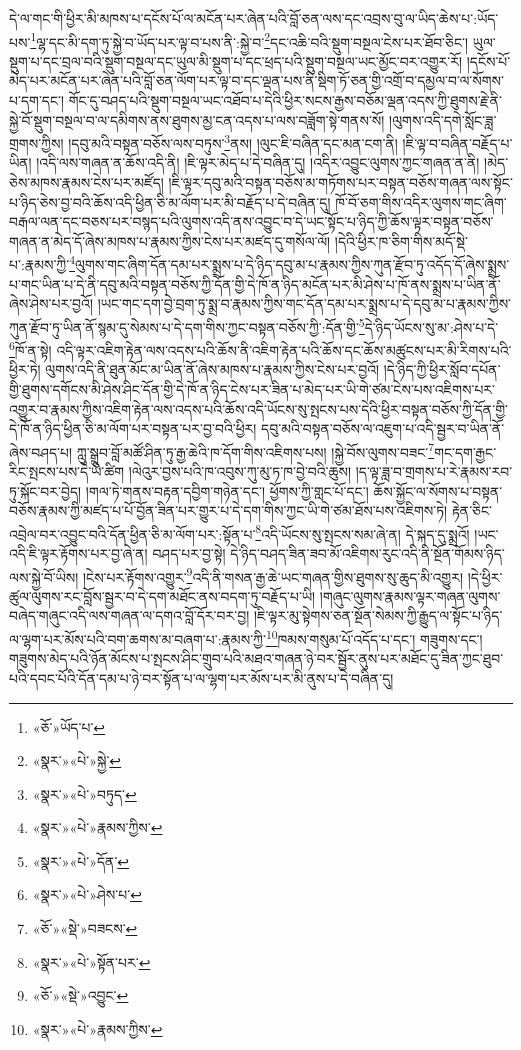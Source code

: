 དེ་ལ་གང་གི་ཕྱིར་མི་མཁས་པ་དངོས་པོ་ལ་མངོན་པར་ཞེན་པའི་བློ་ཅན་ལས་དང་འབྲས་བུ་ལ་ཡིད་ཆེས་པ་:ཡོད་པས་\footnote{«ཅོ་»ཡོད་པ་}ལྷ་དང་མི་དག་ཏུ་སྐྱེ་བ་ཡོད་པར་ལྟ་བ་པས་ནི་:སྐྱེ་བ་\footnote{«སྣར་»«པེ་»སྐྱེ་}དང་འཆི་བའི་སྡུག་བསྔལ་ངེས་པར་ཐོབ་ཅིང་། ཡུལ་སྡུག་པ་དང་བྲལ་བའི་སྡུག་བསྔལ་དང་ཡུལ་མི་སྡུག་པ་དང་ཕྲད་པའི་སྡུག་བསྔལ་ཡང་མྱོང་བར་འགྱུར་རོ། །དངོས་པོ་མེད་པར་མངོན་པར་ཞེན་པའི་བློ་ཅན་ལོག་པར་ལྟ་བ་དང་ལྡན་པས་ནི་སྡིག་ཏོ་ཅན་གྱི་འགྲོ་བ་དམྱལ་བ་ལ་སོགས་པ་དག་དང་། གོང་དུ་བཤད་པའི་སྡུག་བསྔལ་ཡང་འཐོབ་པ་དེའི་ཕྱིར་སངས་རྒྱས་བཅོམ་ལྡན་འདས་ཀྱི་ཐུགས་རྗེ་ནི་སྐྱེ་བོ་སྡུག་བསྔལ་བ་ལ་དམིགས་ནས་ཐུགས་མྱ་ངན་འདས་པ་ལས་བཟློག་སྟེ་གནས་སོ། །ལུགས་འདི་དགེ་སློང་ཟླ་གྲགས་ཀྱིས། །དབུ་མའི་བསྟན་བཅོས་ལས་བཏུས་\footnote{«སྣར་»«པེ་»བཏུད་}ནས། །ལུང་ཇི་བཞིན་དང་མན་ངག་ནི། །ཇི་ལྟ་བ་བཞིན་བརྗོད་པ་ཡིན། །འདི་ལས་གཞན་ན་ཆོས་འདི་ནི། །ཇི་ལྟར་མེད་པ་དེ་བཞིན་དུ། །འདིར་འབྱུང་ལུགས་ཀྱང་གཞན་ན་ནི། །མེད་ཅེས་མཁས་རྣམས་ངེས་པར་མཛོད། །ཇི་ལྟར་དབུ་མའི་བསྟན་བཅོས་མ་གཏོགས་པར་བསྟན་བཅོས་གཞན་ལས་སྟོང་པ་ཉིད་ཅེས་བྱ་བའི་ཆོས་འདི་ཕྱིན་ཅི་མ་ལོག་པར་མི་བརྗོད་པ་དེ་བཞིན་དུ། ཁོ་བོ་ཅག་གིས་འདིར་ལུགས་གང་ཞིག་བརྒལ་ལན་དང་བཅས་པར་བསྙད་པའི་ལུགས་འདི་ནས་འབྱུང་བ་དེ་ཡང་སྟོང་པ་ཉིད་ཀྱི་ཆོས་ལྟར་བསྟན་བཅོས་གཞན་ན་མེད་དོ་ཞེས་མཁས་པ་རྣམས་ཀྱིས་ངེས་པར་མཛད་དུ་གསོལ་ལོ། །དེའི་ཕྱིར་ཁ་ཅིག་གིས་མདོ་སྡེ་པ་:རྣམས་ཀྱི་\footnote{«སྣར་»«པེ་»རྣམས་ཀྱིས་}ལུགས་གང་ཞིག་དོན་དམ་པར་སྨྲས་པ་དེ་ཉིད་དབུ་མ་པ་རྣམས་ཀྱིས་ཀུན་རྫོབ་ཏུ་འདོད་དོ་ཞེས་སྨྲས་པ་གང་ཡིན་པ་དེ་ནི་དབུ་མའི་བསྟན་བཅོས་ཀྱི་དོན་གྱི་དེ་ཁོ་ན་ཉིད་མངོན་པར་མི་ཤེས་པ་ཁོ་ནས་སྨྲས་པ་ཡིན་ནོ་ཞེས་ཤེས་པར་བྱའོ། །ཡང་གང་དག་བྱེ་བྲག་ཏུ་སྨྲ་བ་རྣམས་ཀྱིས་གང་དོན་དམ་པར་སྨྲས་པ་དེ་དབུ་མ་པ་རྣམས་ཀྱིས་ཀུན་རྫོབ་ཏུ་ཡིན་ནོ་སྙམ་དུ་སེམས་པ་དེ་དག་གིས་ཀྱང་བསྟན་བཅོས་ཀྱི་:དོན་གྱི་\footnote{«སྣར་»«པེ་»དོན་}དེ་ཉིད་ཡོངས་སུ་མ་:ཤེས་པ་དེ་\footnote{«སྣར་»«པེ་»ཤེས་པ་}ཁོ་ན་སྟེ། འདི་ལྟར་འཇིག་རྟེན་ལས་འདས་པའི་ཆོས་ནི་འཇིག་རྟེན་པའི་ཆོས་དང་ཆོས་མཚུངས་པར་མི་རིགས་པའི་ཕྱིར་ཏེ། ལུགས་འདི་ནི་ཐུན་མོང་མ་ཡིན་ནོ་ཞེས་མཁས་པ་རྣམས་ཀྱིས་ངེས་པར་བྱའོ། །དེ་ཉིད་ཀྱི་ཕྱིར་སློབ་དཔོན་གྱི་ཐུགས་དགོངས་མི་ཤེས་ཤིང་དོན་གྱི་དེ་ཁོ་ན་ཉིད་ངེས་པར་ཟིན་པ་མེད་པར་ཡི་གེ་ཙམ་ངེས་པས་འཇིགས་པར་འགྱུར་བ་རྣམས་ཀྱིས་འཇིག་རྟེན་ལས་འདས་པའི་ཆོས་འདི་ཡོངས་སུ་སྤངས་པས་དེའི་ཕྱིར་བསྟན་བཅོས་ཀྱི་དོན་གྱི་དེ་ཁོ་ན་ཉིད་ཕྱིན་ཅི་མ་ལོག་པར་བསྟན་པར་བྱ་བའི་ཕྱིར། དབུ་མའི་བསྟན་བཅོས་ལ་འཇུག་པ་འདི་སྦྱར་བ་ཡིན་ནོ་ཞེས་བཤད་པ། ཀླུ་སྒྲུབ་བློ་མཚོ་ཤིན་ཏུ་རྒྱ་ཆེའི་ཁ་དོག་གིས་འཇིགས་པས། །སྐྱེ་བོས་ལུགས་བཟང་\footnote{«ཅོ་»«སྡེ་»བཟངས་}གང་དག་རྒྱང་རིང་སྤངས་པས་དེ་ཡི་ཚིག །ལེའུར་བྱས་པའི་ཁ་འབུས་ཀུ་མུ་ཏ་ཁ་བྱེ་བའི་ཆུས། །ད་ལྟ་ཟླ་བ་གྲགས་པ་རེ་རྣམས་རབ་ཏུ་སྐོང་བར་བྱེད། །གལ་ཏེ་གནས་བརྟན་དབྱིག་གཉེན་དང་། ཕྱོགས་ཀྱི་གླང་པོ་དང་། ཆོས་སྐྱོང་ལ་སོགས་པ་བསྟན་བཅོས་རྣམས་ཀྱི་མཛད་པ་པོ་བྱོན་ཟིན་པར་གྱུར་པ་དེ་དག་གིས་ཀྱང་ཡི་གེ་ཙམ་ཐོས་པས་འཇིགས་ཏེ། རྟེན་ཅིང་འབྲེལ་བར་འབྱུང་བའི་དོན་ཕྱིན་ཅི་མ་ལོག་པར་:སྟོན་པ་\footnote{«སྣར་»«པེ་»སྟོན་པར་}འདི་ཡོངས་སུ་སྤངས་སམ་ཞེ་ན། དེ་སྐད་དུ་སྨྲའོ། །ཡང་འདི་ཇི་ལྟར་རྟོགས་པར་བྱ་ཞེ་ན། བཤད་པར་བྱ་སྟེ། དེ་ཉིད་བཤད་ཟིན་ཟབ་མོ་འཇིགས་རུང་འདི་ནི་སྔོན་གོམས་ཉིད་ལས་སྐྱེ་བོ་ཡིས། །ངེས་པར་རྟོགས་འགྱུར་\footnote{«ཅོ་»«སྡེ་»འབྱུང་}འདི་ནི་གསན་རྒྱ་ཆེ་ཡང་གཞན་གྱིས་ཐུགས་སུ་ཆུད་མི་འགྱུར། །དེ་ཕྱིར་ཚུལ་ལུགས་རང་བློས་སྦྱར་བ་དེ་དག་མཐོང་ནས་བདག་ཏུ་བརྗོད་པ་ཡི། །གཞུང་ལུགས་རྣམས་ལྟར་གཞན་ལུགས་བཞེད་གཞུང་འདི་ལས་གཞན་ལ་དགའ་བློ་དོར་བར་བྱ། །ཇི་ལྟར་མུ་སྟེགས་ཅན་སྔོན་སེམས་ཀྱི་རྒྱུད་ལ་སྟོང་པ་ཉིད་ལ་ལྷག་པར་མོས་པའི་བག་ཆགས་མ་བཞག་པ་:རྣམས་ཀྱི་\footnote{«སྣར་»«པེ་»རྣམས་ཀྱིས་}ཁམས་གསུམ་པོ་འདོད་པ་དང་། གཟུགས་དང་། གཟུགས་མེད་པའི་ཉོན་མོངས་པ་སྤངས་ཤིང་གྲུབ་པའི་མཐའ་གཞན་ཉེ་བར་སྦྱོར་ནུས་པར་མཐོང་དུ་ཟིན་ཀྱང་ཐུབ་པའི་དབང་པོའི་དོན་དམ་པ་ཉེ་བར་སྟོན་པ་ལ་ལྷག་པར་མོས་པར་མི་ནུས་པ་དེ་བཞིན་དུ། 